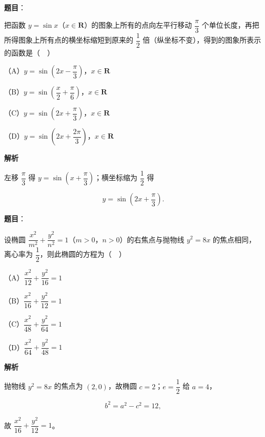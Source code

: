 \begin{answer}

\textbf{题目}：

把函数 $y=\sin x$（$x\in\mathbf R$）的图象上所有的点向左平行移动 $\dfrac{\pi}3$ 个单位长度，再把所得图象上所有点的横坐标缩短到原来的 $\dfrac12$ 倍（纵坐标不变），得到的图象所表示的函数是（　）

（A）$y=\sin\left(2x-\dfrac{\pi}3\right)$，$x\in\mathbf R$

（B）$y=\sin\left(\dfrac x2+\dfrac{\pi}6\right)$，$x\in\mathbf R$

（C）$y=\sin\left(2x+\dfrac{\pi}3\right)$，$x\in\mathbf R$

（D）$y=\sin\left(2x+\dfrac{2\pi}3\right)$，$x\in\mathbf R$

\textbf{解析}

左移 $\dfrac{\pi}3$ 得 $y=\sin\left(x+\dfrac{\pi}3\right)$；横坐标缩为 $\dfrac12$ 得

\nopagebreak[4]
\[y=\sin\left(2x+\frac{\pi}3\right).\]


\end{answer}
\begin{answer}

\textbf{题目}：

设椭圆 $\dfrac{x^2}{m^2}+\dfrac{y^2}{n^2}=1$（$m>0$，$n>0$）的右焦点与抛物线 $y^2=8x$ 的焦点相同，离心率为 $\dfrac12$，则此椭圆的方程为（　）

（A）$\dfrac{x^2}{12}+\dfrac{y^2}{16}=1$

（B）$\dfrac{x^2}{16}+\dfrac{y^2}{12}=1$

（C）$\dfrac{x^2}{48}+\dfrac{y^2}{64}=1$

（D）$\dfrac{x^2}{64}+\dfrac{y^2}{48}=1$

\textbf{解析}

抛物线 $y^2=8x$ 的焦点为 $(2,0)$，故椭圆 $c=2$；$e=\dfrac12$ 给 $a=4$，

\nopagebreak[4]
\[b^2=a^2-c^2=12,\]

故 $\dfrac{x^2}{16}+\dfrac{y^2}{12}=1$。


\end{answer}
